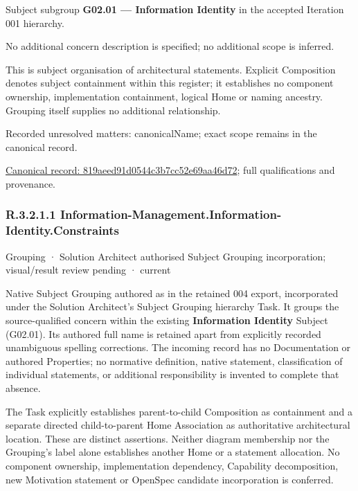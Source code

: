 Subject subgroup \textbf{G02.01 — Information Identity} in the accepted Iteration 001 hierarchy.



No additional concern description is specified; no additional scope is inferred.



This is subject organisation of architectural statements. Explicit Composition denotes subject containment within this register; it establishes no component ownership, implementation containment, logical Home or naming ancestry. Grouping itself supplies no additional relationship.


{\small Recorded unresolved matters: canonicalName; exact scope remains in the canonical record.}\par
{\footnotesize \href{../../../../continuum/grouping/819aeed91d0544c3b7cc52e69aa46d72.md}{Canonical record: 819aeed91d0544c3b7cc52e69aa46d72}; full qualifications and provenance.}\par
\subsubsection*{R.3.2.1.1 Information-Management.Information-Identity.Constraints}
\label{navigation:R.3.2.1.1}

\label{element:9c7c9de7ffc0457d87cf52548bca70ca}
{\small Grouping · Solution Architect authorised Subject Grouping incorporation; visual/result review pending · current}\par

Native Subject Grouping authored as \texttt{} in the retained 004 export,
incorporated under the Solution Architect's Subject Grouping hierarchy Task.
It groups the source-qualified \texttt{} concern within
the existing \textbf{Information Identity} Subject (G02.01). Its authored full name
is retained apart from explicitly recorded unambiguous spelling corrections.
The incoming record has no Documentation or authored Properties; no normative
definition, native statement, classification of individual statements, or
additional responsibility is invented to complete that absence.



The Task explicitly establishes parent-to-child Composition as containment and
a separate directed child-to-parent Home Association as authoritative architectural
location. These are distinct assertions. Neither diagram membership nor the
Grouping's label alone establishes another Home or a statement allocation.
No component ownership, implementation dependency, Capability decomposition,
new Motivation statement or OpenSpec candidate incorporation is conferred.



